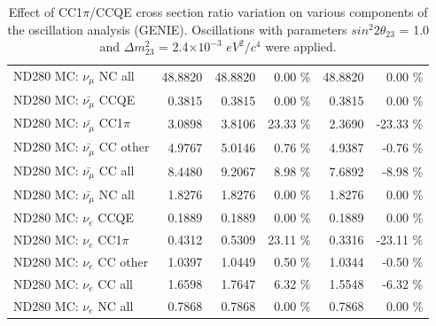 \begin{table}
\begin{tabular}{| l | r | r  r | r  r |}
                                          ND280 MC: $\nu_{\mu}$ NC all &         48.8820 &         48.8820 &  0.00 \%  &         48.8820 &  0.00 \%  \\ 
                                      ND280 MC: $\bar{\nu_{\mu}}$ CCQE &          0.3815 &          0.3815 &  0.00 \%  &          0.3815 &  0.00 \%  \\ 
                                  ND280 MC: $\bar{\nu_{\mu}}$ CC1$\pi$ &          3.0898 &          3.8106 & 23.33 \%  &          2.3690 & -23.33 \%  \\ 
                                  ND280 MC: $\bar{\nu_{\mu}}$ CC other &          4.9767 &          5.0146 &  0.76 \%  &          4.9387 & -0.76 \%  \\ 
                                    ND280 MC: $\bar{\nu_{\mu}}$ CC all &          8.4480 &          9.2067 &  8.98 \%  &          7.6892 & -8.98 \%  \\ 
                                    ND280 MC: $\bar{\nu_{\mu}}$ NC all &          1.8276 &          1.8276 &  0.00 \%  &          1.8276 &  0.00 \%  \\ 
                                              ND280 MC: $\nu_{e}$ CCQE &          0.1889 &          0.1889 &  0.00 \%  &          0.1889 &  0.00 \%  \\ 
                                          ND280 MC: $\nu_{e}$ CC1$\pi$ &          0.4312 &          0.5309 & 23.11 \%  &          0.3316 & -23.11 \%  \\ 
                                          ND280 MC: $\nu_{e}$ CC other &          1.0397 &          1.0449 &  0.50 \%  &          1.0344 & -0.50 \%  \\ 
                                            ND280 MC: $\nu_{e}$ CC all &          1.6598 &          1.7647 &  6.32 \%  &          1.5548 & -6.32 \%  \\ 
                                            ND280 MC: $\nu_{e}$ NC all &          0.7868 &          0.7868 &  0.00 \%  &          0.7868 &  0.00 \%  \\ 
\hline
\end{tabular}
\caption{ 
  Effect of CC1$\pi$/CCQE cross section ratio variation 
  on various components of the oscillation analysis (GENIE).
  Oscillations with parameters $sin^{2}2\theta_{23}$ = 1.0 and $\Delta m^{2}_{23}$ = 2.4$\times10^{-3}$ $eV^{2}/c^{4}$ were applied.  
}
\label{tab:genie_xsec_cc1pi_to_ccqe}
\end{table}



